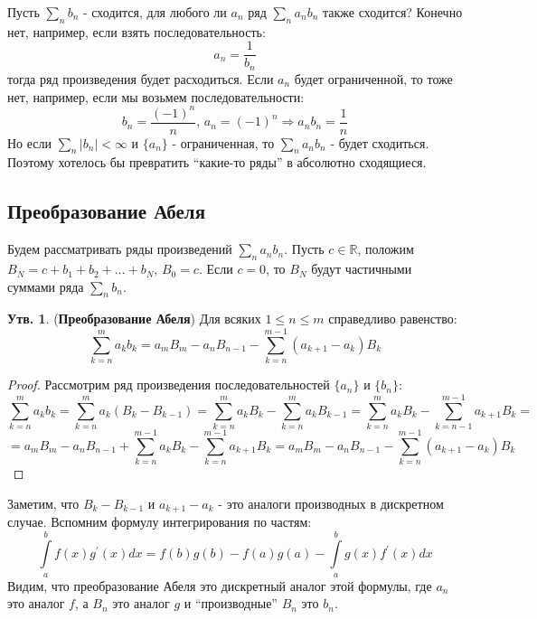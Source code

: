 \documentclass[12pt]{article}
\newcommand{\MR}{\mathbb{R}}
\theoremstyle{definition}
\newtheorem{prop}{Утв.}
\newcommand{\ddint}[2]{\displaystyle\int\limits_{#1}^{#2}}
\begin{document}
Пусть $\displaystyle \sum\limits_n b_n$ - сходится, для любого ли $a_n$ ряд $ \displaystyle \sum\limits_n a_nb_n$ также сходится? Конечно нет, например, если взять последовательность: 
$$
	a_n = \dfrac{1}{b_n} 
$$ 
тогда ряд произведения будет расходиться. Если $a_n$ будет ограниченной, то тоже нет, например, если мы возьмем  последовательности:
$$
	b_n = \dfrac{(-1)^n}{n}, \, a_n = (-1)^n \Rightarrow a_n b_n = \dfrac{1}{n}
$$
Но если $\displaystyle \sum\limits_n |b_n| < \infty$ и $\{a_n\}$ - ограниченная, то $\displaystyle \sum\limits_n a_n b_n$ - будет сходиться. Поэтому хотелось бы превратить ``какие-то ряды'' в абсолютно сходящиеся.

\subsection*{Преобразование Абеля}
Будем рассматривать ряды произведений $\displaystyle \sum\limits_{n}a_nb_n$. Пусть $c \in \MR$, положим $B_N = c + b_1 + b_2 + \dotsc + b_N, \, B_0 = c$. Если $c = 0$, то $B_N$ будут частичными суммами ряда $\displaystyle \sum\limits_n b_n$.

\begin{prop}(\textbf{Преобразование Абеля})
	Для всяких $1 \leq n \leq m$ справедливо равенство:
	$$
		\sum\limits_{k = n}^m a_k b_k = a_m B_m - a_n B_{n-1} - \sum\limits_{k = n}^{m-1} (a_{k+1} - a_k)B_k
	$$
\end{prop}
\begin{proof}
	Рассмотрим ряд произведения последовательностей $\{a_n\}$ и $\{b_n\}$:
	$$
		\sum\limits_{k = n}^m a_k b_k = \sum\limits_{k = n}^m a_k (B_k - B_{k-1}) = \sum\limits_{k = n}^m a_k B_k- \sum\limits_{k = n}^m a_k B_{k-1} = \sum\limits_{k = n}^m a_k B_k- \sum\limits_{k = n-1}^{m-1} a_{k+1} B_{k} = 
	$$
	$$
		= a_m B_m - a_n B_{n-1} + \sum\limits_{k = n}^{m-1} a_k B_k - \sum\limits_{k = n}^{m-1} a_{k+1} B_k = a_m B_m - a_n B_{n-1} - \sum\limits_{k = n}^{m-1} (a_{k+1} - a_k)B_k
	$$
\end{proof}

Заметим, что $B_k - B_{k-1}$ и $a_{k+1} - a_k$ - это аналоги производных в дискретном случае. Вспомним формулу интегрирования по частям:
$$
	\ddint{a}{b}f(x)g^\prime(x)dx = f(b)g(b) - f(a)g(a) - \ddint{a}{b}g(x)f^\prime(x)dx		
$$
Видим, что преобразование Абеля это дискретный аналог этой формулы, где $a_n$ это аналог $f$, а $B_n$ это аналог $g$ и ``производные'' $B_n$ это $b_n$.
\end{document}
